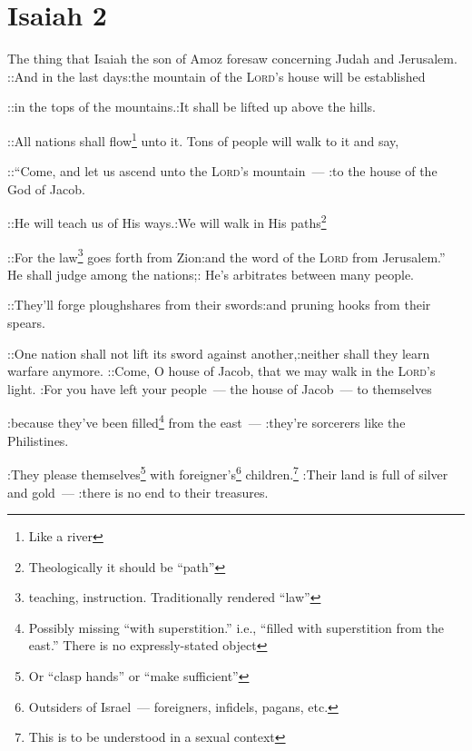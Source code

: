 \section{Isaiah 2}\label{Isaiah 2}
\begin{enumerate}[align=center]
     The thing that Isaiah the son of Amoz foresaw concerning Judah and Jerusalem.%
     ::And in the last days:the mountain of the \textsc{Lord}'s house will be established%
    
    ::in the tops of the mountains.:It shall be lifted up above the hills.%
    
    ::All nations shall flow\footnote{Like a river} unto it. Tons of people will walk to it and say,%
    
    ::``Come, and let us ascend unto the \textsc{Lord}'s mountain~--- :to the house of the God of Jacob.%
    
    ::He will teach us of His ways.:We will walk in His paths\footnote{Theologically it should be ``path''}%
    
    ::For the law\footnote{teaching, instruction. Traditionally rendered ``law''} goes forth from Zion:and the word of the \textsc{Lord} from Jerusalem.''%
     He shall judge among the nations;: He's arbitrates between many people.%
    
    ::They'll forge ploughshares from their swords:and pruning hooks from their spears.%
    
    ::One nation shall not lift its sword against another,:neither shall they learn warfare anymore.%
     ::Come, O house of Jacob, that we may walk in the \textsc{Lord}'s light.%
     :For you have left your people~--- the house of Jacob~--- to themselves%
    
    :because they've been filled\footnote{Possibly missing ``with superstition.'' i.e., ``filled with superstition from the east.'' There is no expressly-stated object} from the east~--- :they're sorcerers like the Philistines.%
    
    :They please themselves\footnote{Or ``clasp hands'' or ``make sufficient''} with foreigner's\footnote{Outsiders of Israel~--- foreigners, infidels, pagans, etc.} children.\footnote{This is to be understood in a sexual context}%
     :Their land is full of silver and gold~--- :there is no end to their treasures.%
    

\end{enumerate}
